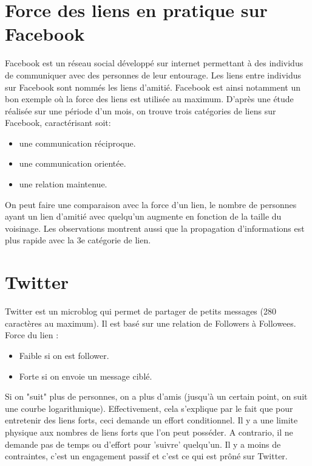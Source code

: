 \section{Force des liens en pratique sur Facebook}
Facebook est un réseau social développé sur internet permettant à des individus de communiquer avec des personnes de leur entourage.
Les liens entre individus sur Facebook sont nommés les liens d'amitié.
Facebook est ainsi notamment un bon exemple où la force des liens est utilisée au maximum.
D'après une étude réalisée sur une période d'un mois, on trouve trois catégories de liens sur Facebook, caractérisant soit:
\begin{itemize}
\item une communication réciproque.
\item une communication orientée.
\item une relation maintenue.
\end{itemize}
On peut faire une comparaison avec la force d'un lien, le nombre de personnes ayant un lien d'amitié avec quelqu'un augmente en fonction de la taille du voisinage. 
Les observations montrent aussi que la propagation d'informations est plus rapide avec la 3e catégorie de lien.
\newline

\section{Twitter}
Twitter est un microblog qui permet de partager de petits messages (280 caractères au maximum). Il est basé sur une relation de Followers à Followees.
Force du lien :
\begin{itemize}
\item Faible si on est follower.
\item Forte si on envoie un message ciblé.
\end{itemize}
Si on "suit" plus de personnes, on a plus d'amis (jusqu'à un certain point, on suit une courbe logarithmique). Effectivement, cela s'explique par le fait que pour entretenir des liens forts, ceci demande un effort conditionnel. Il y a une limite physique aux nombres de liens forts que l'on peut posséder. A contrario, il ne demande pas de temps ou d'effort pour 'suivre' quelqu'un. Il y a moins de contraintes, c'est un engagement passif et c'est ce qui est prôné sur Twitter.
